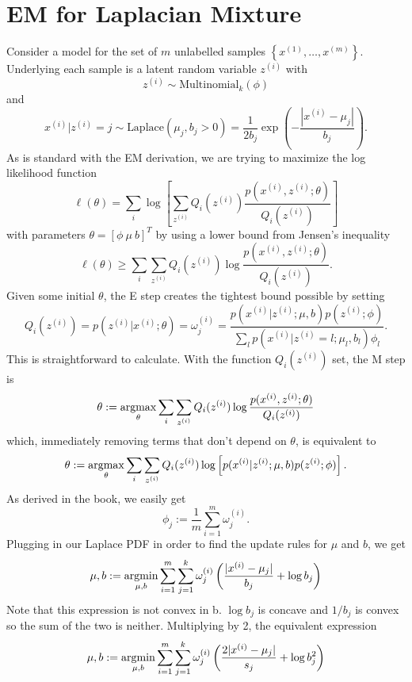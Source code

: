 \documentclass[12pt]{article}
\begin{document}
\section{EM for Laplacian Mixture}
Consider a model for the set of $m$ unlabelled samples $\left\{ x^{(1)}, \dots, x^{(m)} \right\}$. Underlying each sample is a latent random variable $z^{(i)}$ with 
\begin{equation}
\label{z}
z^{(i)} \sim \text{Multinomial}_k(\phi)
\end{equation}
and
\begin{equation}
\label{z}
x^{(i)} | z^{(i)} = j \sim \text{Laplace}(\mu_j, b_j > 0) = \frac{1}{2 b_j} \exp \left( - \frac{| x^{(i)} - \mu_j |}{b_j} \right).
\end{equation}
As is standard with the EM derivation, we are trying to maximize the log likelihood function
\[
\ell \left( \theta \right) = \sum_i \log \left[ \sum_{z^{(i)}} Q_i(z^{(i)}) \frac{p(x^{(i)}, z^{(i)} ; \theta)}{Q_i(z^{(i)})} \right]
\]
with parameters $\theta = [\phi\ \mu\ b]^T$ by using a lower bound from Jensen's inequality
\[
\ell \left( \theta \right) \geq \sum_i \sum_{z^{(i)}} Q_i(z^{(i)}) \log  \frac{p(x^{(i)}, z^{(i)} ; \theta)}{Q_i(z^{(i)})}.
\]
Given some initial $\theta$, the E step creates the tightest bound possible by setting
\[
Q_i(z^{(i)}) = p(z^{(i)} | x^{(i)} ; \theta) = \omega_j^{(i)} = \frac{p(x^{(i)} | z^{(i)} ; \mu, b) p(z^{(i)} ; \phi)}{\sum_{l} p(x^{(i)} | z^{(i)} = l ; \mu_l, b_l) \phi_l}.
\]
This is straightforward to calculate. With the function $Q_i(z^{(i)})$ set, the M step is
\[
\theta := \mathop{\rm argmax}_{\theta} \sum_i \sum_{z^{(i)}} Q_i(z^{(i)}) \log  \frac{p(x^{(i)}, z^{(i)} ; \theta)}{Q_i(z^{(i)})}
\]
which, immediately removing terms that don't depend on $\theta$, is equivalent to
\[
\theta := \mathop{\rm argmax}_{\theta} \sum_i \sum_{z^{(i)}} Q_i(z^{(i)}) \log  \left[ p(x^{(i)} | z^{(i)} ; \mu, b) p( z^{(i)} ; \phi) \right].
\]
As derived in the book, we easily get
\begin{equation}
\label{phiUpdate}
\phi_j := \frac{1}{m} \sum_{i=1}^{m} \omega_j^{(i)}.
\end{equation}
Plugging in our Laplace PDF in order to find the update rules for $\mu$ and $b$, we get
\[
\mu, b := \mathop{\rm argmin}_{\mu, b} \sum_{i=1}^m \sum_{j=1}^k \omega_j^{(i)} \left( \frac{|x^{(i)} - \mu_j|}{b_j} + \log b_j \right)
\]
Note that this expression is not convex in b. $\log b_j$ is concave and $1/b_j$ is convex so the sum of the two is neither. Multiplying by 2, the equivalent expression
\[
\mu, b := \mathop{\rm argmin}_{\mu, b} \sum_{i=1}^m \sum_{j=1}^k \omega_j^{(i)} \left(  \frac{2 |x^{(i)} - \mu_j|}{s_j} + \log b_j^2 \right)
\]
\end{document}
